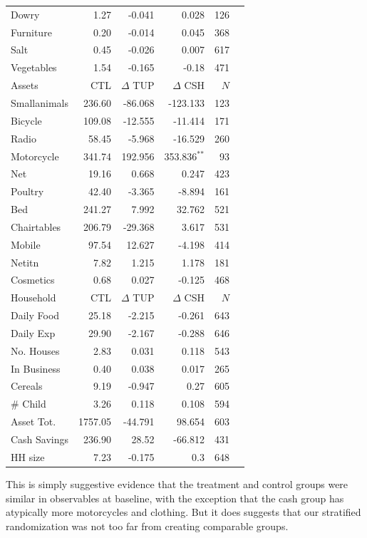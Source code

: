 \documentclass[12pt,article]{article}
\begin{document}
\begin{longtable}{lrrrrr}
Dowry & 1.27 & -0.041 & 0.028 & 126\\
Furniture & 0.20 & -0.014 & 0.045 & 368\\
Salt & 0.45 & -0.026 & 0.007 & 617\\
Vegetables & 1.54 & -0.165 & -0.18 & 471\\
\hline
Assets & CTL & $\Delta$ TUP & $\Delta$ CSH & $N$\\
\hline
Smallanimals & 236.60 & -86.068 & -123.133 & 123\\
Bicycle & 109.08 & -12.555 & -11.414 & 171\\
Radio & 58.45 & -5.968 & -16.529 & 260\\
Motorcycle & 341.74 & 192.956 & 353.836$^{\text{**}}$ & 93\\
Net & 19.16 & 0.668 & 0.247 & 423\\
Poultry & 42.40 & -3.365 & -8.894 & 161\\
Bed & 241.27 & 7.992 & 32.762 & 521\\
Chairtables & 206.79 & -29.368 & 3.617 & 531\\
Mobile & 97.54 & 12.627 & -4.198 & 414\\
Netitn & 7.82 & 1.215 & 1.178 & 181\\
Cosmetics & 0.68 & 0.027 & -0.125 & 468\\
\hline
Household & CTL & $\Delta$ TUP & $\Delta$ CSH & $N$\\
\hline
Daily Food & 25.18 & -2.215 & -0.261 & 643\\
Daily Exp & 29.90 & -2.167 & -0.288 & 646\\
No. Houses & 2.83 & 0.031 & 0.118 & 543\\
In Business & 0.40 & 0.038 & 0.017 & 265\\
Cereals & 9.19 & -0.947 & 0.27 & 605\\
\# Child & 3.26 & 0.118 & 0.108 & 594\\
Asset Tot. & 1757.05 & -44.791 & 98.654 & 603\\
Cash Savings & 236.90 & 28.52 & -66.812 & 431\\
HH size & 7.23 & -0.175 & 0.3 & 648\\
\hline
\end{longtable}

This is simply suggestive evidence that the treatment and control groups were similar
in observables at baseline, with the exception that the cash group has atypically
more motorcycles and clothing. But it does suggests that our stratified randomization
was not too far from creating comparable groups.
\end{document}
